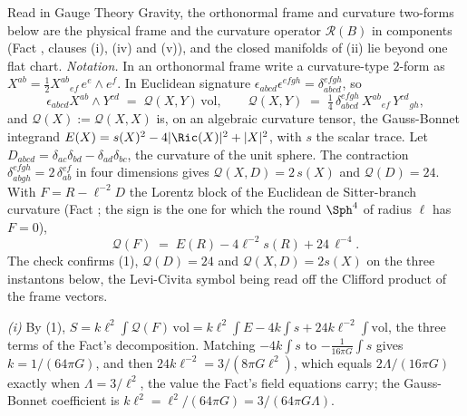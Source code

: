 Read in Gauge Theory Gravity, the orthonormal frame and curvature two-forms below are the physical frame and the curvature operator $\mathcal{R}(B)$ in components (Fact , clauses (i), (iv) and (v)), and the closed manifolds of (ii) lie beyond one flat chart. \emph{Notation.} In an orthonormal frame write a curvature-type $2$-form as $X^{ab} = \tfrac12 X^{ab}{}_{ef}\,e^{e}\wedge e^{f}$. In Euclidean signature $\epsilon_{abcd}\epsilon^{efgh} = \delta^{efgh}_{abcd}$, so
\[
\epsilon_{abcd}X^{ab}\wedge Y^{cd} \;=\; \mathcal{Q}(X, Y)\,\mathrm{vol}, \qquad \mathcal{Q}(X, Y) \;=\; \tfrac14\,\delta^{efgh}_{abcd}\,X^{ab}{}_{ef}\,Y^{cd}{}_{gh},
\]
and $\mathcal{Q}(X) := \mathcal{Q}(X, X)$ is, on an algebraic curvature tensor, the Gauss-Bonnet integrand $E(X) = s(X)^{2} - 4|\Ric(X)|^{2} + |X|^{2}$, with $s$ the scalar trace. Let $D_{abcd} = \delta_{ac}\delta_{bd} - \delta_{ad}\delta_{bc}$, the curvature of the unit sphere. The contraction $\delta^{efgh}_{abgh} = 2\,\delta^{ef}_{ab}$ in four dimensions gives $\mathcal{Q}(X, D) = 2\,s(X)$ and $\mathcal{Q}(D) = 24$. With $F = R - \ell^{-2}D$ the Lorentz block of the Euclidean de Sitter-branch curvature (Fact ; the sign is the one for which the round $\Sph^{4}$ of radius $\ell$ has $F = 0$),
\begin{equation}
\mathcal{Q}(F) \;=\; E(R) - 4\ell^{-2}s(R) + 24\,\ell^{-4}. \tag{1}
\end{equation}
The check confirms (1), $\mathcal{Q}(D) = 24$ and $\mathcal{Q}(X, D) = 2s(X)$ on the three instantons below, the Levi-Civita symbol being read off the Clifford product of the frame vectors.

\emph{(i)} By (1), $S = k\ell^{2}\int\mathcal{Q}(F)\,\mathrm{vol} = k\ell^{2}\int E - 4k\int s + 24k\ell^{-2}\int\mathrm{vol}$, the three terms of the Fact's decomposition. Matching $-4k\int s$ to $-\tfrac{1}{16\pi G}\int s$ gives $k = 1/(64\pi G)$, and then $24k\ell^{-2} = 3/(8\pi G\ell^{2})$, which equals $2\Lambda/(16\pi G)$ exactly when $\Lambda = 3/\ell^{2}$, the value the Fact's field equations carry; the Gauss-Bonnet coefficient is $k\ell^{2} = \ell^{2}/(64\pi G) = 3/(64\pi G\Lambda)$.

